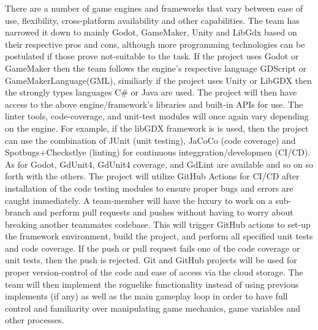 There are a number of game engines and frameworks that vary between ease of use, flexibility, cross-platform availability and other capabilities.
The team has narrowed it down to mainly Godot, GameMaker, Unity and LibGdx based on their respective pros and cons, although more programming technologies can be postulated if those prove not-suitable to the task. 
If the project uses Godot or GameMaker then the team follows the engine's respective language GDScript or GameMakerLanguage(GML), similiarly if the project uses Unity or LibGDX then the strongly types languages C\# or Java are used.
\newline
\newline
The project will then have access to the above engine/framework's libraries and built-in APIs for use. The linter tools, code-coverage, and unit-test modules will once again vary depending on the engine. For example, if the libGDX framework is
is used, then the project can use the combination of JUnit (unit testing), JaCoCo (code coverage) and Spotbugs+Checkstlye (linting) for continuous integgration/developmen (CI/CD). As for Godot, GdUnit4, GdUnit4 coverage, and GdLint are 
available and so on so forth with the others.
\newline
\newline
The project will utilize GitHub Actions for CI/CD after installation of the code testing modules to ensure proper bugs and errors are caught immediately.
A team-member will have the luxury to work on a sub-branch and perform pull requests and pushes without having to worry about breaking another teammates codebase.
This will trigger GitHub actions to set-up the framework environment, build the project, and perform all specified unit tests and code coverage. If the push or pull request fails one of the code coverage or unit tests, then the push is rejected.
Git and GitHub projects will be used for proper version-control of the code and ease of access via the cloud storage.
The team will then implement the roguelike functionality instead of using previous implements (if any) as well as the main gameplay loop in order to have full control and familiarity over manipulating game mechanics, game variables and other processes.
